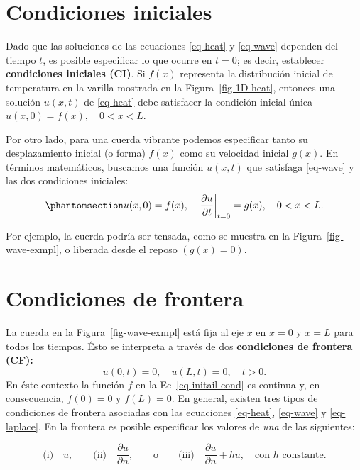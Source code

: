 \documentclass[
  spanish,
  us-letterpaper,
]{scrreprt}
\theoremstyle{definition}
\theoremstyle{plain}
\theoremstyle{remark}
\begin{document}
\section{Condiciones iniciales}\label{condiciones-iniciales}

Dado que las soluciones de las ecuaciones \ref{eq-heat} y \ref{eq-wave}
dependen del tiempo \(t\), es posible especificar lo que ocurre en
\(t = 0\); es decir, establecer \textbf{condiciones iniciales (CI)}. Si
\(f(x)\) representa la distribución inicial de temperatura en la varilla
mostrada en la Figura~\ref{fig-1D-heat}, entonces una solución
\(u(x, t)\) de \ref{eq-heat} debe satisfacer la condición inicial única
\(u(x, 0) = f(x), \quad 0 < x < L\).

Por otro lado, para una cuerda vibrante podemos especificar tanto su
desplazamiento inicial (o forma) \(f(x)\) como su velocidad inicial
\(g(x)\). En términos matemáticos, buscamos una función \(u(x, t)\) que
satisfaga \ref{eq-wave} y las dos condiciones iniciales:
\begin{equation}\phantomsection\label{eq-initail-cond}{
u(x, 0) = f(x), \quad \left. \frac{\partial u}{\partial t} \right|_{t=0} = g(x), \quad 0 < x < L.
}\end{equation}

Por ejemplo, la cuerda podría ser tensada, como se muestra en la
Figura~\ref{fig-wave-exmpl}, o liberada desde el reposo \((g(x)=0)\).

\section{Condiciones de frontera}\label{condiciones-de-frontera}

La cuerda en la Figura~\ref{fig-wave-exmpl} está fija al eje \(x\) en
\(x=0\) y \(x=L\) para todos los tiempos. Ésto se interpreta a través de
dos \textbf{condiciones de frontera (CF):} \[
u(0,t) = 0, \quad u(L,t)=0, \quad t>0.
\] En éste contexto la función \(f\) en la Ec~\ref{eq-initail-cond} es
continua y, en consecuencia, \(f(0)=0\) y \(f(L)=0\). En general,
existen tres tipos de condiciones de frontera asociadas con las
ecuaciones \ref{eq-heat}, \ref{eq-wave} y \ref{eq-laplace}. En la
frontera es posible especificar los valores de \emph{una} de las
siguientes:

\[
\text{(i)}\quad u, \qquad \text{(ii)}\quad \dfrac{\partial u}{\partial n},\qquad \text{o}\qquad \text{(iii)}\quad \dfrac{\partial u}{\partial n} + hu,\quad \text{con $h$ constante.}
\]
\end{document}
